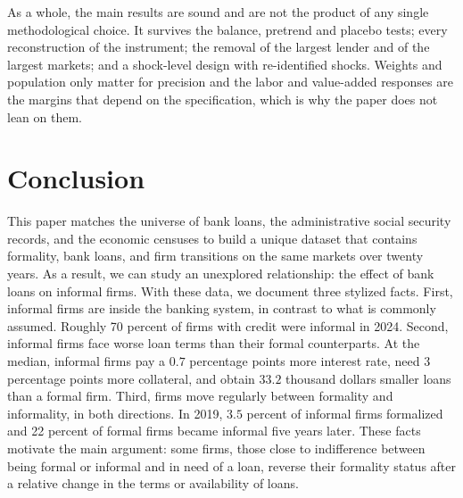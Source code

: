 \documentclass[12pt]{article}
\begin{document}
As a whole, the main results are sound and are not the product of any single methodological choice. It survives the balance, pretrend and placebo tests; every reconstruction of the instrument; the removal of the largest lender and of the largest markets; and a shock-level design with re-identified shocks. Weights and population only matter for precision and the labor and value-added responses are the margins that depend on the specification, which is why the paper does not lean on them.

\section{Conclusion}
\label{conclusion}

This paper matches the universe of bank loans, the administrative social security records, and the economic censuses to build a unique dataset that contains formality, bank loans, and firm transitions on the same markets over twenty years. As a result, we can study an unexplored relationship: the effect of bank loans on informal firms. With these data, we document three stylized facts. First, informal firms are inside the banking system, in contrast to what is commonly assumed. Roughly 70 percent of firms with credit were informal in 2024. Second, informal firms face worse loan terms than their formal counterparts. At the median, informal firms pay a $0.7$ percentage points more interest rate, need $3$ percentage points more collateral, and obtain $33.2$ thousand dollars smaller loans than a formal firm. Third, firms move regularly between formality and informality, in both directions. In 2019, $3.5$ percent of informal firms formalized and 22 percent of formal firms became informal five years later. These facts motivate the main argument: some firms, those close to indifference between being formal or informal and in need of a loan, reverse their formality status after a relative change in the terms or availability of loans. 
\end{document}
